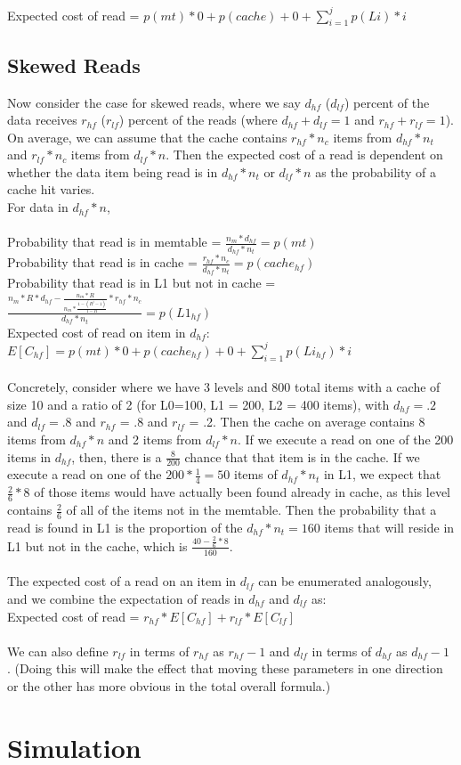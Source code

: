 \documentclass[11pt]{article}
\theoremstyle{plain}
\theoremstyle{definition}
\begin{document}
Expected cost of read = $p(mt) * 0  + p(cache) + 0 + \sum_{i=1}^j p(Li) * i$

\subsection{Skewed Reads}

Now consider the case for skewed reads, where we say $d_{hf}$ ($d_{lf}$) percent of the data receives $r_{hf}$ ($r_{lf}$) percent of the reads (where $d_{hf} + d_{lf} = 1$ and $r_{hf} + r_{lf} = 1$). On average, we can assume that the cache contains $r_{hf} * n_c$ items from $d_{hf} * n_t$ and $r_{lf} * n_c$ items from $d_{lf} * n$. Then the expected cost of a read is dependent on whether the data item being read is in $d_{hf} * n_t$ or $d_{lf} * n$ as the probability of a cache hit varies.\\
For data in $d_{hf} * n$, \\ \\
Probability that read is in memtable = $\frac{n_m*d_{hf}}{d_{hf} *n_t}  = p(mt)$\\
Probability that read is in cache = $\frac{r_{hf} * n_c}{d_{hf} * n_t} = p(cache_{hf})$ \\
Probability that read is in L1 but not in cache = $ \frac{n_m * R*d_{hf} - \frac{n_m * R}{n_m * \frac{1-(R^j-1)}{1-R}} * r_{hf} * n_c}{d_{hf} * n_t}  = p(L1_{hf})$ \\
Expected cost of read on item in $d_{hf}$: $E[C_{hf}]= p(mt) * 0  + p(cache_{hf}) + 0 + \sum_{i=1}^j p(Li_{hf}) * i$\\ \\
Concretely, consider where we have 3 levels and 800 total items with a cache of size 10 and a ratio of 2  (for L0=100, L1 = 200, L2 = 400 items), with $d_{hf} = .2$ and $d_{lf} = .8$ and $r_{hf}$ = .8 and $r_{lf}$ = .2. Then the cache on average contains 8 items from $d_{hf} * n$ and 2 items from $d_{lf}*n$. If we execute a read on one of the 200 items in $d_{hf}$, then, there is a $\frac{8}{200}$ chance that that item is in the cache. If we execute a read on one of the $200*\frac{1}{4} = 50$ items of  $d_{hf} * n_t$ in L1, we expect that $\frac{2}{6} * 8$ of those items would have actually been found already in cache, as this level contains $\frac{2}{6}$ of all of the items not in the memtable. Then the probability that a read is found in L1 is the proportion of the $d_{hf} * n_t = 160$ items that will reside in L1 but not in the cache, which is $\frac{40 - \frac{2}{6} * 8}{160}$. \\ \\
The expected cost of a read on an item in $d_{lf}$ can be enumerated analogously, and we combine the expectation of reads in $d_{hf}$ and $d_{lf}$ as: \\
Expected cost of read = $r_{hf} * E[C_{hf}] + r_{lf} * E[C_{lf}]$ \\ \\
We can also define $r_{lf}$ in terms of $r_{hf}$ as $r_{hf} - 1$ and  $d_{lf}$ in terms of $d_{hf}$ as $d_{hf} - 1$ . (Doing this will make the effect that moving these parameters in one direction or the other has more obvious in the total overall formula.)

\section{Simulation}
\end{document}
